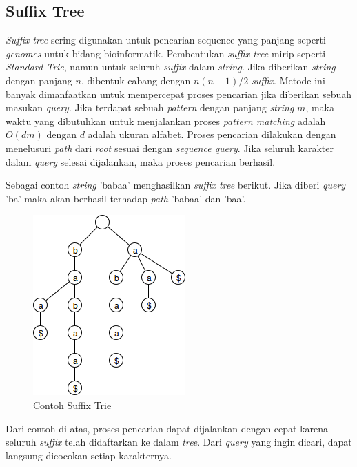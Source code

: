 \subsection{Suffix Tree} \label{sec:suffix-tree}
\textit{Suffix tree} sering digunakan untuk pencarian sequence yang panjang seperti \textit{genomes} untuk bidang bioinformatik. Pembentukan \textit{suffix tree} mirip seperti \textit{Standard Trie}, namun untuk seluruh \textit{suffix} dalam \textit{string}. Jika diberikan \textit{string} dengan panjang $n$, dibentuk cabang dengan $n(n-1)/2$ \textit{suffix}.  Metode ini banyak dimanfaatkan untuk mempercepat proses pencarian jika diberikan sebuah masukan \textit{query}. Jika terdapat sebuah \textit{pattern} dengan panjang \textit{string} $m$, maka waktu yang dibutuhkan untuk menjalankan proses \textit{pattern matching} adalah $O(dm)$ dengan $d$ adalah ukuran alfabet. Proses pencarian dilakukan dengan menelusuri \textit{path} dari \textit{root} sesuai dengan \textit{sequence query}. Jika seluruh karakter dalam \textit{query} selesai dijalankan, maka proses pencarian berhasil. 

Sebagai contoh \textit{string} 'babaa' menghasilkan \textit{suffix tree} berikut. Jika diberi \textit{query} 'ba' maka akan berhasil terhadap \textit{path} 'babaa' dan 'baa'.
\begin{figure}
    \centering
    \includegraphics[scale=0.6]{pics/Contoh-SuffixTree}
    \caption{Contoh Suffix Trie}
    \label{fig:contoh-suffix-trie}
\end{figure}

\noindent Dari contoh di atas, proses pencarian dapat dijalankan dengan cepat karena seluruh \textit{suffix} telah didaftarkan ke dalam \textit{tree}. Dari \textit{query} yang ingin dicari, dapat langsung dicocokan setiap karakternya.

